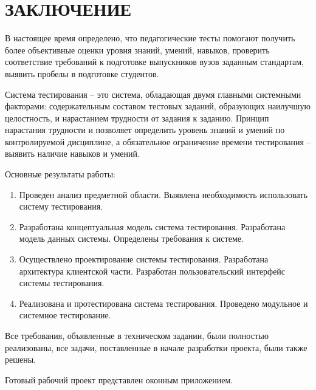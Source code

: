 \section*{ЗАКЛЮЧЕНИЕ}

В настоящее время определено, что педагогические тесты помогают получить более объективные оценки уровня знаний, умений, навыков, проверить соответствие требований к подготовке выпускников вузов заданным стандартам, выявить пробелы в подготовке студентов.
  
Система тестирования – это система, обладающая двумя главными системными факторами: содержательным составом тестовых заданий, образующих наилучшую целостность, и нарастанием трудности от задания к заданию. Принцип нарастания трудности и позволяет определить уровень знаний и умений по контролируемой дисциплине, а обязательное ограничение времени тестирования – выявить наличие навыков и умений.

Основные результаты работы:

\begin{enumerate}
\item Проведен анализ предметной области. Выявлена необходимость использовать систему тестирования.
\item Разработана концептуальная модель система тестирования. Разработана модель данных системы. Определены требования к системе.
\item Осуществлено проектирование системы тестирования. Разработана архитектура клиентской части. Разработан пользовательский интерфейс системы тестирования.
\item Реализована и протестирована система тестирования. Проведено модульное и системное тестирование.
\end{enumerate}

Все требования, объявленные в техническом задании, были полностью реализованы, все задачи, поставленные в начале разработки проекта, были также решены.

Готовый рабочий проект представлен оконным приложением.  
